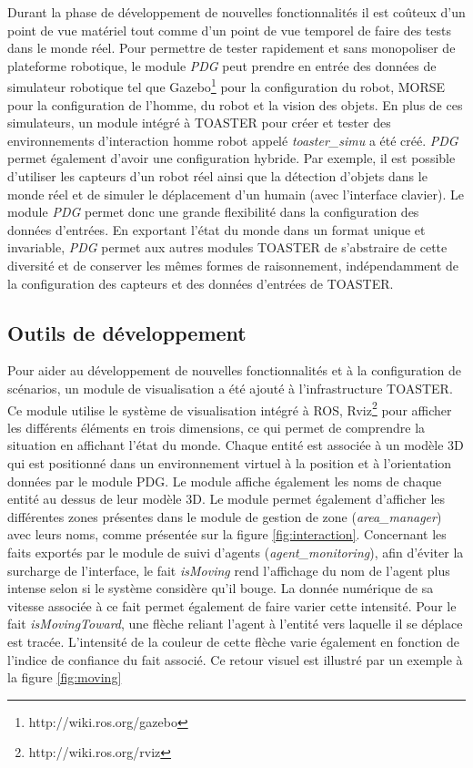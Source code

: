 \documentclass[a4paper,11pt,twoside]{StyleThese}
\begin{document}
Durant la phase de développement de nouvelles fonctionnalités il est coûteux d'un point de vue matériel tout comme d'un point de vue temporel de faire des tests dans le monde réel. Pour permettre de tester rapidement et sans monopoliser de plateforme robotique, le module \textit{PDG} peut prendre en entrée des données de simulateur robotique tel que Gazebo\footnote{http://wiki.ros.org/gazebo} pour la configuration du robot, MORSE\cite{echeverria11} pour la configuration de l'homme, du robot et la vision des objets. En plus de ces simulateurs, un module intégré à TOASTER pour créer et tester des environnements d'interaction homme robot appelé \textit{toaster\_simu} a été créé. \textit{PDG} permet également d'avoir une configuration hybride.
Par exemple, il est possible d'utiliser les capteurs d'un robot réel ainsi que la détection d'objets dans le monde réel et de simuler le déplacement d'un humain (avec l'interface clavier).
Le module \textit{PDG} permet donc une grande flexibilité dans la configuration des données d'entrées. En exportant l'état du monde dans un format unique et invariable, \textit{PDG} permet aux autres modules TOASTER de s'abstraire de cette diversité et de conserver les mêmes formes de raisonnement, indépendamment de la configuration des capteurs et des données d'entrées de TOASTER.

\subsection{Outils de développement}
Pour aider au développement de nouvelles fonctionnalités et à la configuration de scénarios, un module de visualisation a été ajouté à l'infrastructure TOASTER. Ce module utilise le système de visualisation intégré à ROS, Rviz\footnote{http://wiki.ros.org/rviz} pour afficher les différents éléments en trois dimensions, ce qui permet de comprendre la situation en affichant l'état du monde. Chaque entité est associée à un modèle 3D qui est positionné dans un environnement virtuel à la position et à l'orientation données par le module PDG. Le module affiche également les noms de chaque entité au dessus de leur modèle 3D. 
Le module permet également d'afficher les différentes zones présentes dans le module de gestion de zone (\textit{area\_manager}) avec leurs noms, comme présentée sur la figure \ref{fig:interaction}.
Concernant les faits exportés par le module de suivi d'agents (\textit{agent\_monitoring}), afin d'éviter la surcharge de l'interface, le fait \textit{isMoving} rend l'affichage du nom de l'agent plus intense selon si le système considère qu'il bouge. La donnée numérique de sa vitesse associée à ce fait permet également de faire varier cette intensité. Pour le fait \textit{isMovingToward}, une flèche reliant l'agent à l'entité vers laquelle il se déplace est tracée. L'intensité de la couleur de cette flèche varie également en fonction de l'indice de confiance du fait associé. Ce retour visuel est illustré par un exemple à la figure \ref{fig:moving}
\end{document}
